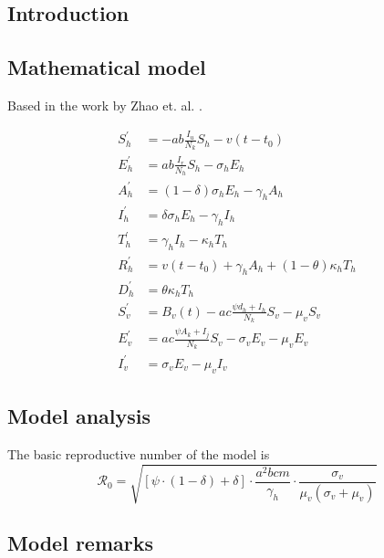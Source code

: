 \documentclass{book}
\begin{document}
\subsection*{Introduction}

\subsection*{Mathematical model}
Based in the work by Zhao et. al. \cite{zhao2018modelling}.

\begin{equation}
\begin{split}
S_{h}^{\prime} &=-a b \frac{I_{u}}{N_{k}} S_{h}-v\left(t-t_{0}\right) \\
E_{h}^{\prime} &=a b \frac{I_{r}}{N_{h}} S_{h}-\sigma_{h} E_{h} \\
A_{h}^{\prime} &=(1-\delta) \sigma_{h} E_{h}-\gamma_{h} A_{h} \\
I_{h}^{\prime} &=\delta \sigma_{h} E_{h}-\gamma_{h} I_{h} \\
T_{h}^{\prime} &=\gamma_{h} I_{h}-\kappa_{h} T_{h} \\
R_{h}^{\prime} &=v\left(t-t_{0}\right)+\gamma_{h} A_{h}+(1-\theta) \kappa_{h} T_{h} \\
D_{h}^{\prime} &=\theta \kappa_{h} T_{h} \\[2ex]
S_{v}^{\prime} &=B_{v}(t)-a c \frac{\psi d_{h}+I_{h}}{N_{k}} S_{v}-\mu_{v} S_{v} \\
E_{v}^{\prime} &=a c \frac{\psi A_{k}+I_{j}}{N_{k}} S_{v}-\sigma_{v} E_{v}-\mu_{v} E_{v} \\
I_{v}^{\prime} &=\sigma_{v} E_{v}-\mu_{v} I_{v}
\end{split}
\end{equation}

\subsection*{Model analysis}
The basic reproductive number of the model is 
\begin{equation}
\mathcal{R}_{0}=\sqrt{[\psi \cdot(1-\delta)+\delta] \cdot \frac{a^{2} b c m}{\gamma_{h}} \cdot \frac{\sigma_{v}}{\mu_{v}\left(\sigma_{v}+\mu_{v}\right)}}
\end{equation}

\subsection*{Model remarks}

\end{document}
